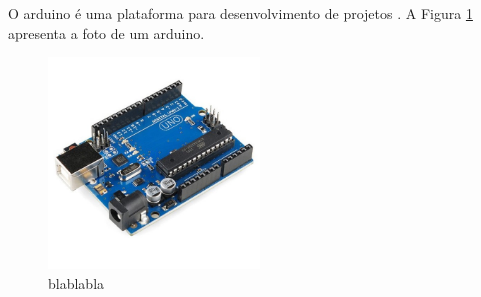 \documentclass{article}
\begin{document}
O arduino é uma plataforma para desenvolvimento de projetos \cite{LivroArduino}. A Figura \ref{fig:Arduino} apresenta a foto de um arduino.


\begin{figure}[H]
    \centering
    \includegraphics[width=0.5\textwidth]{figures/Arduino.jpg}
    \caption{blablabla}
    \label{fig:Arduino}
\end{figure}
\end{document}
